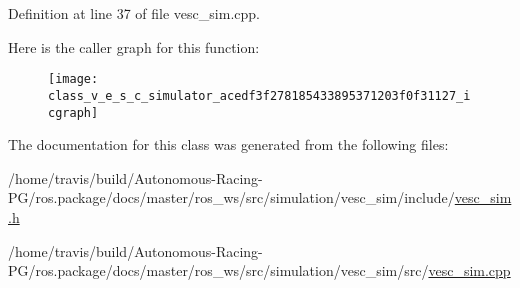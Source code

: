 Definition at line 37 of file vesc\+\_\+sim.\+cpp.



Here is the caller graph for this function\+:
\nopagebreak
\begin{figure}[H]
\begin{center}
\leavevmode
\texttt{[image: class\_v\_e\_s\_c\_simulator\_acedf3f278185433895371203f0f31127\_icgraph]}
\end{center}
\end{figure}




The documentation for this class was generated from the following files\+:\begin{DoxyCompactItemize}
\item 
/home/travis/build/\+Autonomous-\/\+Racing-\/\+P\+G/ros.\+package/docs/master/ros\+\_\+ws/src/simulation/vesc\+\_\+sim/include/\hyperlink{vesc__sim_8h}{vesc\+\_\+sim.\+h}\item 
/home/travis/build/\+Autonomous-\/\+Racing-\/\+P\+G/ros.\+package/docs/master/ros\+\_\+ws/src/simulation/vesc\+\_\+sim/src/\hyperlink{vesc__sim_8cpp}{vesc\+\_\+sim.\+cpp}\end{DoxyCompactItemize}

